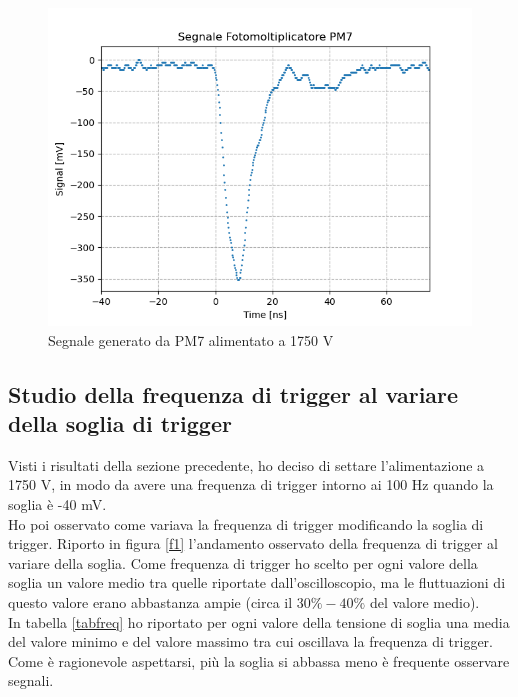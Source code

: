 \documentclass{article}
\begin{document}
\begin{figure}[h!]
\begin{center}
\includegraphics[scale=0.7]{Grafici/PM5_segnale.png}
\caption{Segnale generato da PM7 alimentato a 1750 V} \label{f_PM}
\end{center}
\end{figure}
\newpage

\subsection{Studio della frequenza di trigger al variare della soglia di trigger}
Visti i risultati della sezione precedente, ho deciso di settare l'alimentazione a 1750 V, in modo da avere una frequenza di trigger intorno ai 100 Hz quando la soglia è -40 mV. 
\\
Ho poi osservato come variava la frequenza di trigger modificando la soglia di trigger. Riporto in figura \ref{f1} l'andamento osservato della frequenza di trigger al variare della soglia. Come frequenza di trigger ho scelto per ogni valore della soglia un valore medio tra quelle riportate dall'oscilloscopio, ma le fluttuazioni di questo valore erano abbastanza ampie (circa il $30\%-40\%$ del valore medio). \\
In tabella \ref{tabfreq} ho riportato per ogni valore della tensione di soglia una media del valore minimo e del valore massimo tra cui oscillava la frequenza di trigger. \\ Come è ragionevole aspettarsi, più la soglia si abbassa meno è frequente osservare segnali. 
\end{document}
